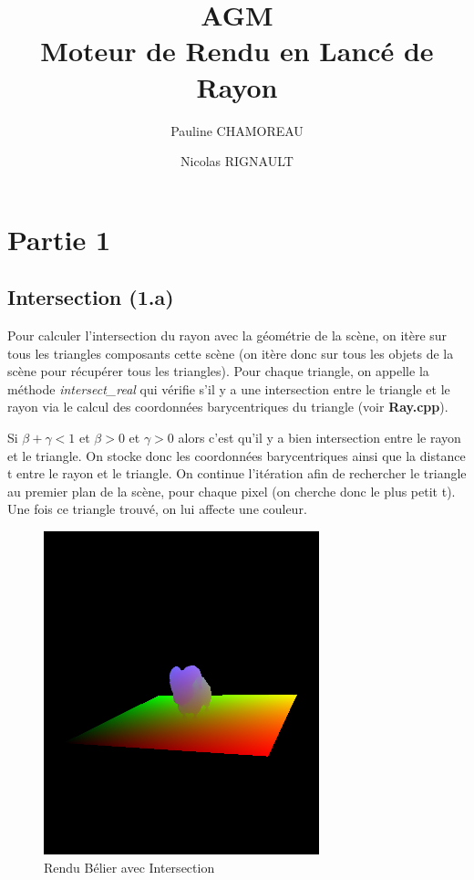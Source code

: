 \documentclass[a4paper,11pt,titlepage]{article}
\title{AGM\\Moteur de Rendu en Lancé de Rayon}
\author{Pauline CHAMOREAU \and Nicolas RIGNAULT}
\begin{document}
\maketitle

\newpage
\section{Partie 1}

\subsection{Intersection (1.a)}

Pour calculer l'intersection du rayon avec la géométrie de la scène, on itère sur tous les triangles composants cette scène (on itère donc sur tous les objets de la scène pour récupérer tous les triangles). Pour chaque triangle, on appelle la méthode \textit{intersect\_real} qui vérifie s'il y a une intersection entre le triangle et le rayon via le calcul des coordonnées barycentriques du triangle (voir \textbf{Ray.cpp}).

Si $\beta + \gamma < 1$ et $\beta > 0$ et $\gamma > 0$ alors c'est qu'il y a bien intersection entre le rayon et le triangle. On stocke donc les coordonnées barycentriques ainsi que la distance t entre le rayon et le triangle. On continue l'itération afin de rechercher le triangle au premier plan de la scène, pour chaque pixel (on cherche donc le plus petit t). Une fois ce triangle trouvé, on lui affecte une couleur.\\

\begin{figure}[H]
 \begin{center}
 \includegraphics[bb=0 0 50 50,width=8cm]{Rendu/Intersection.png}
 \end{center}

 \caption{Rendu Bélier avec Intersection}
 \label{rendu1}
\end{figure}
\end{document}
